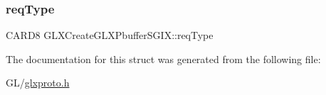\subsubsection{\texorpdfstring{req\+Type}{reqType}}
{\footnotesize\ttfamily C\+A\+R\+D8 G\+L\+X\+Create\+G\+L\+X\+Pbuffer\+S\+G\+I\+X\+::req\+Type}



The documentation for this struct was generated from the following file\+:\begin{DoxyCompactItemize}
\item 
G\+L/\hyperlink{glxproto_8h}{glxproto.\+h}\end{DoxyCompactItemize}
